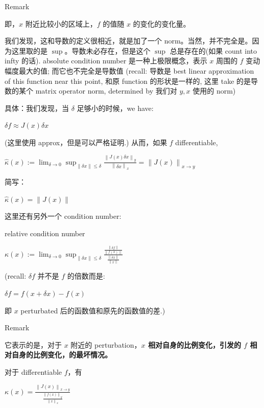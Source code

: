 \begin{qlremark}{Remark}

即，\(x\) 附近比较小的区域上，\(f\) 的值随 \(x\) 的变化的变化量。

我们发现，这和导数的定义很相近，就是加了一个 norm。当然，并不完全是。因为这里取的是 \(\sup\)。导数未必存在，但是这个 \(\sup\) 总是存在的(如果 count into infty 的话). absolute condition number 是一种上极限概念，表示 \(x\) 周围的 \(f\) 变动幅度最大的值; 而它也不完全是导数值 (recall: 导数是 best linear approximation of this function near this point, 和原 function 的形状是一样的, 这里 take 的是导数的某个 matrix operator norm, determined by 我们对 \(y,x\) 使用的 norm)

具体：我们发现，当 \(\delta\) 足够小的时候，we have:

\(\delta f \approx J(x)\delta x\)

(这里使用 approx，但是可以严格证明.) 从而，如果 \(f\) differentiable,

\(\widehat{\kappa}(x) := \lim_{\delta\rightarrow 0}\sup_{{\|{\delta x}\|} \leq \delta}\frac{\left\| {J(x)\delta x} \right\|_{y}}{\left\| {\delta x} \right\|_{x}} = \left\| {J(x)} \right\|_{x\rightarrow y}\)

简写：

\(\widehat{\kappa}(x) = \left\| {J(x)} \right\|\)

\end{qlremark}

这里还有另外一个 condition number:

\begin{definition}{relative condition number}

\(\kappa(x) := \lim_{\delta\rightarrow 0}\sup_{{\|{\delta x}\|} \leq \delta}\frac{\frac{\left\| {\delta f} \right\|}{\left\| {f(x)} \right\|}}{\frac{\left\| {\delta x} \right\|}{\left\| x \right\|}}\)

(recall: \(\delta f\) 并不是 \(f\) 的倍数而是:

\(\delta f = f\left( {x + \delta x} \right) - f(x)\)

即 \(x\) perturbated 后的函数值和原先的函数值的差.)

\end{definition}

\begin{qlremark}{Remark}

它表示的是，对于 \(x\) 附近的 perturbation，\textbf{\(x\) 相对自身的比例变化，引发的 \(f\) 相对自身的比例变化，的最坏情况。}

对于 differentiable \(f\)，有

\(\kappa(x) = \frac{\left\| {J(x)} \right\|_{x\rightarrow y}}{\frac{\left\| {f(x)} \right\|_{y}}{\left\| x \right\|_{x}}}\)

\end{qlremark}

